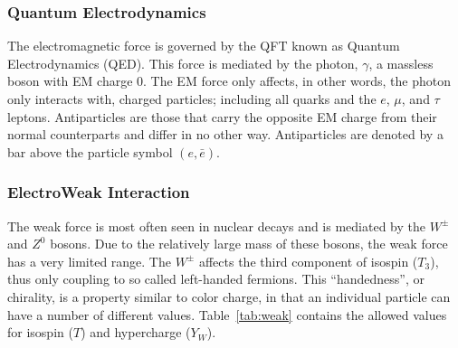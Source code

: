 		\subsubsection{Quantum Electrodynamics}\label{sssec:QED}

		The electromagnetic force is governed by the QFT known as Quantum Electrodynamics (QED). This force is mediated by the photon, $\gamma$, a massless boson with EM charge 0. The EM force only affects, in other words, the photon only interacts with, charged particles; including all quarks and the $e$, $\mu$, and $\tau$ leptons. Antiparticles are those that carry the opposite EM charge from their normal counterparts and differ in no other way. Antiparticles are denoted by a bar above the particle symbol $(e, \bar{e})$.

		\subsubsection{ElectroWeak Interaction}\label{sssec:ElectroWeak}

		The weak force is most often seen in nuclear decays and is mediated by the $W^{\pm}$ and $Z^0$ bosons. Due to the relatively large mass of these bosons, the weak force has a very limited range. The $W^{\pm}$ affects the third component of isospin ($T_3$), thus only coupling to so called left-handed fermions. This ``handedness'', or chirality, is a property similar to color charge, in that an individual particle can have a number of different values. Table~\ref{tab:weak} contains the allowed values for isospin ($T$) and hypercharge ($Y_W$). 

